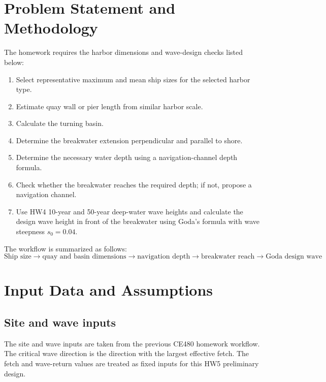 \documentclass[11pt,a4paper]{article}
\begin{document}
\section{Problem Statement and Methodology}
The homework requires the harbor dimensions and wave-design checks listed below:
\begin{enumerate}[leftmargin=1.0cm]
    \item Select representative maximum and mean ship sizes for the selected harbor type.
    \item Estimate quay wall or pier length from similar harbor scale.
    \item Calculate the turning basin.
    \item Determine the breakwater extension perpendicular and parallel to shore.
    \item Determine the necessary water depth using a navigation-channel depth formula.
    \item Check whether the breakwater reaches the required depth; if not, propose a navigation channel.
    \item Use HW4 10-year and 50-year deep-water wave heights and calculate the design wave height in front of the breakwater using Goda's formula with wave steepness $s_0=0.04$.
\end{enumerate}

The workflow is summarized as follows:
\[
\text{Ship size} \rightarrow \text{quay and basin dimensions} \rightarrow \text{navigation depth} \rightarrow \text{breakwater reach} \rightarrow \text{Goda design wave}
\]

\section{Input Data and Assumptions}
\subsection{Site and wave inputs}
The site and wave inputs are taken from the previous CE480 homework workflow. The critical wave direction is the direction with the largest effective fetch. The fetch and wave-return values are treated as fixed inputs for this HW5 preliminary design.
\end{document}

